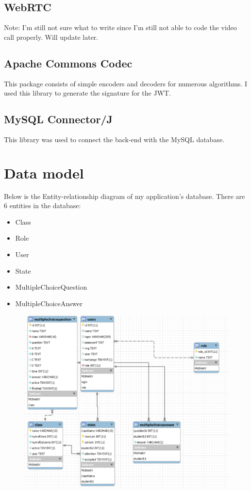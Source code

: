 \documentclass[a4paper, 11pt,openany]{book} %
\begin{document}
\subsection{WebRTC}
Note: I'm still not sure what to write since I'm still not able to code the video call properly. Will update later.

\subsection{Apache Commons Codec}
This package consists of simple encoders and decoders for numerous algorithms.\cite{codec} I used this library to generate the signature for the JWT.

\subsection{MySQL Connector/J}
This library was used to connect the back-end with the MySQL database.

\section{Data model}
Below is the Entity-relationship diagram of my application's database. There are 6 entities in the database:
\begin{itemize}
    \item Class
    \item Role
    \item User
    \item State
    \item MultipleChoiceQuestion
    \item MultipleChoiceAnswer
\end{itemize}
\begin{figure}[H]
    \centering
    \includegraphics[width=\textwidth,height=\textheight,keepaspectratio]{images/erdiagram.png}
\end{figure}
\end{document}
